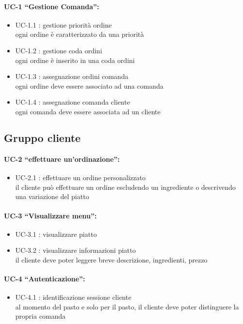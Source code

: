 \paragraph{UC-1 “Gestione Comanda”:}
\begin{itemize}
	\item UC-1.1 : gestione priorità ordine \\ ogni ordine è caratterizzato da una priorità
	\item UC-1.2 : gestione coda ordini \\
	ogni ordine è inserito in una coda ordini
	\item UC-1.3 : assegnazione ordini comanda \\
	ogni ordine deve essere associato ad una comanda
	\item UC-1.4 : assegnazione comanda cliente \\
	ogni comanda deve essere associata ad un cliente
\end{itemize}

\subsection{Gruppo cliente}
\paragraph{UC-2 “effettuare un’ordinazione”:}
\begin{itemize}
	\item UC-2.1 : effettuare un ordine personalizzato \\
	il cliente può effettuare un ordine escludendo un ingrediente o descrivendo una variazione del piatto
\end{itemize}

\paragraph{UC-3 “Visualizzare menu”:}
\begin{itemize}
	\item UC-3.1 : visualizzare piatto 
	\item UC-3.2 : visualizzare informazioni piatto \\
	il cliente deve poter leggere breve descrizione, ingredienti, prezzo
\end{itemize}

\paragraph{UC-4 “Autenticazione”:}
\begin{itemize}
	\item UC-4.1 : identificazione sessione cliente \\ 
	al momento del pasto e solo per il pasto, il cliente deve poter distinguere la propria comanda
\end{itemize}


